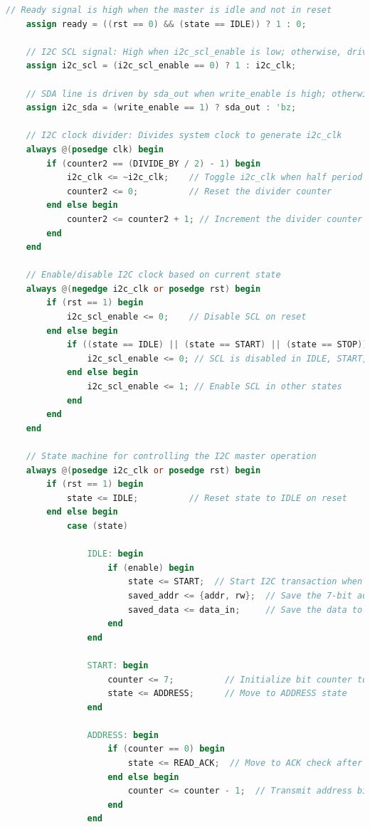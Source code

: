 \documentclass[a4paper,12pt]{report}
\begin{document}
\begin{lstlisting}[language=Verilog, caption={I2C Master Module in Verilog}, label=lst:i2c_master]
    // Ready signal is high when the master is idle and not in reset
    assign ready = ((rst == 0) && (state == IDLE)) ? 1 : 0;

    // I2C SCL signal: High when i2c_scl_enable is low; otherwise, driven by i2c_clk
    assign i2c_scl = (i2c_scl_enable == 0) ? 1 : i2c_clk;

    // SDA line is driven by sda_out when write_enable is high; otherwise, it's in high-impedance
    assign i2c_sda = (write_enable == 1) ? sda_out : 'bz;

    // I2C clock divider: Divides system clock to generate i2c_clk
    always @(posedge clk) begin
        if (counter2 == (DIVIDE_BY / 2) - 1) begin
            i2c_clk <= ~i2c_clk;    // Toggle i2c_clk when half period is reached
            counter2 <= 0;          // Reset the divider counter
        end else begin
            counter2 <= counter2 + 1; // Increment the divider counter
        end
    end

    // Enable/disable I2C clock based on current state
    always @(negedge i2c_clk or posedge rst) begin
        if (rst == 1) begin
            i2c_scl_enable <= 0;    // Disable SCL on reset
        end else begin
            if ((state == IDLE) || (state == START) || (state == STOP)) begin
                i2c_scl_enable <= 0; // SCL is disabled in IDLE, START, and STOP states
            end else begin
                i2c_scl_enable <= 1; // Enable SCL in other states
            end
        end
    end

    // State machine for controlling the I2C master operation
    always @(posedge i2c_clk or posedge rst) begin
        if (rst == 1) begin
            state <= IDLE;          // Reset state to IDLE on reset
        end else begin
            case (state)
                
                IDLE: begin
                    if (enable) begin
                        state <= START;  // Start I2C transaction when enable is high
                        saved_addr <= {addr, rw};  // Save the 7-bit address and RW bit
                        saved_data <= data_in;     // Save the data to be sent (in write mode)
                    end
                end

                START: begin
                    counter <= 7;          // Initialize bit counter to 7 for 8-bit transmission
                    state <= ADDRESS;      // Move to ADDRESS state
                end

                ADDRESS: begin
                    if (counter == 0) begin 
                        state <= READ_ACK;  // Move to ACK check after sending address and RW bit
                    end else begin
                        counter <= counter - 1;  // Transmit address bits, count down
                    end
                end


\end{lstlisting}
\end{document}
